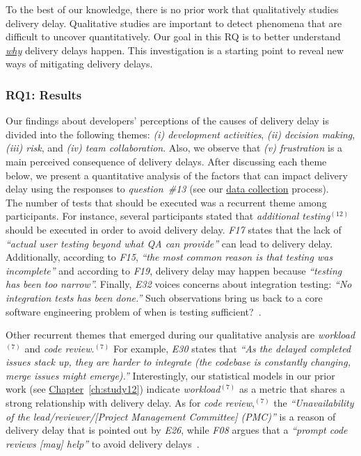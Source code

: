 To the best of our knowledge, there is no prior work that qualitatively studies
delivery delay. Qualitative studies are important to detect phenomena that are
difficult to uncover quantitatively. Our goal in this RQ is to better understand
{\em \underline{why}} delivery delays happen. This investigation is a starting
point to reveal new ways of mitigating delivery delays.\\

\subsubsection*{RQ1: Results}

\begin{sloppypar} Our findings about developers' perceptions of the causes of
	delivery delay is divided into the following themes: {\em (i)
	development activities}, {\em (ii) decision making}, {\em (iii) risk},
	and {\em (iv) team collaboration}. Also, we observe that {\em (v)
	frustration} is a main perceived consequence of delivery delays. After
	discussing each theme below, we present a quantitative analysis of the
	factors that can impact delivery delay using the responses to {\em
	question~\#13} (see our \hyperref[ch5:datacollection2]{data collection}
	process).\\ 

\noindent{} 
The number of tests that should be executed was a recurrent theme among
participants. For instance, several participants stated that {\em additional
testing}$^{(12)}$ should be executed in order to avoid delivery delay. {\em
F17} states that the lack of {\em ``actual user testing beyond what QA can
provide''} can lead to delivery delay. Additionally, according to {\em F15},
{\em ``the most common reason is that testing was incomplete''} and according to {\em
F19}, delivery delay may happen because {\em ``testing has been too
narrow''.} Finally, {\em E32} voices concerns about integration testing: {\em
``No integration tests has been done.''} Such observations bring us back to a
core software engineering problem of when is testing
sufficient?~\cite{beller2015much,alghamdi2016automated}.

Other recurrent themes that emerged during our qualitative analysis are {\em
workload}$^{(7)}$ and {\em code review}.$^{(7)}$ For example, {\em E30} states
that {\em ``As the delayed completed issues stack up, they are harder to
integrate (the codebase is constantly changing, merge issues might emerge).''}
Interestingly, our statistical models in our prior work (see
\hyperref[ch:study12]{Chapter}~\ref{ch:study12})
indicate {\em workload}$^{(7)}$ as a metric that shares a strong relationship
with delivery delay. As for {\em code review},$^{(7)}$ the {\em
``Unavailability of the lead/reviewer/[Project Management Committee] (PMC)''} is
a reason of delivery delay that is pointed out by {\em E26}, while {\em F08}
argues that a {\em ``prompt code reviews [may] help''} to avoid delivery
delays~\cite{mcintosh2016emse}.\\


\end{sloppypar}
